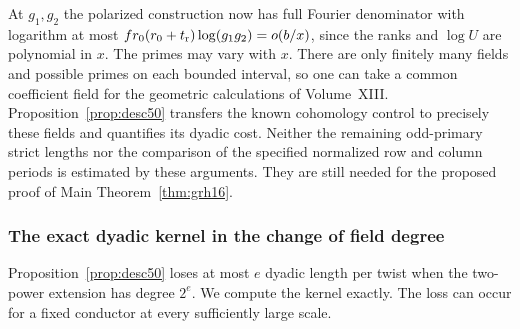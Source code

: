 \documentclass[a4paper,11pt]{article}
\theoremstyle{definition}
\theoremstyle{remark}
\numberwithin{equation}{section}
\begin{document}
At \(g_1,g_2\) the polarized construction now has full Fourier
denominator with logarithm at most
\(f r_0(r_0+t_{\rm r})\log(g_1g_2)=o(b/x)\), since the ranks
and \(\log U\) are polynomial in \(x\). The primes may vary with
\(x\). There are only finitely many fields and possible primes on
each bounded interval, so one can take a common coefficient field for
the geometric calculations of Volume~XIII. Proposition~\ref{prop:desc50}
transfers the known cohomology control to precisely these fields and
quantifies its dyadic cost. Neither the remaining odd-primary strict
lengths nor the comparison of the specified normalized row and
column periods is estimated by these arguments. They are still needed
for the proposed proof of Main Theorem~\ref{thm:grh16}.

\subsubsection{The exact dyadic kernel in the change of field degree}\label{nav:I-32}
Proposition~\ref{prop:desc50} loses at most \(e\) dyadic length per
twist when the two-power extension has degree \(2^e\). We compute the
kernel exactly. The loss can occur for a fixed conductor at every
sufficiently large scale.
\end{document}
